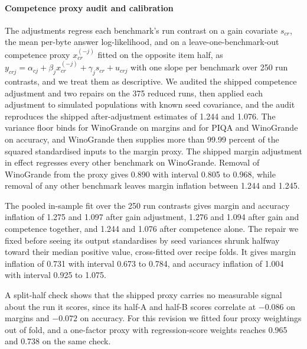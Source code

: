 \paragraph{Competence proxy audit and calibration}
\label{app:proxy}
The adjustments regress each benchmark's run contrast on a gain covariate $s_{cr}$, the mean per-byte answer log-likelihood, and on a leave-one-benchmark-out competence proxy $x_{cr}^{(-j)}$ fitted on the opposite item half, as $y_{crj}=\alpha_{cj}+\beta_jx_{cr}^{(-j)}+\gamma_js_{cr}+u_{crj}$ with one slope per benchmark over 250 run contrasts, and we treat them as descriptive. We audited the shipped competence adjustment and two repairs on the 375 reduced runs, then applied each adjustment to simulated populations with known seed covariance, and the audit reproduces the shipped after-adjustment estimates of 1.244 and 1.076. The variance floor binds for WinoGrande on margins and for PIQA and WinoGrande on accuracy, and WinoGrande then supplies more than 99.99 percent of the squared standardised inputs to the margin proxy. The shipped margin adjustment in effect regresses every other benchmark on WinoGrande. Removal of WinoGrande from the proxy gives 0.890 with interval 0.805 to 0.968, while removal of any other benchmark leaves margin inflation between 1.244 and 1.245.

The pooled in-sample fit over the 250 run contrasts gives margin and accuracy inflation of 1.275 and 1.097 after gain adjustment, 1.276 and 1.094 after gain and competence together, and 1.244 and 1.076 after competence alone. The repair we fixed before seeing its output standardises by seed variances shrunk halfway toward their median positive value, cross-fitted over recipe folds. It gives margin inflation of 0.731 with interval 0.673 to 0.784, and accuracy inflation of 1.004 with interval 0.925 to 1.075.

A split-half check shows that the shipped proxy carries no measurable signal about the run it scores, since its half-A and half-B scores correlate at $-0.086$ on margins and $-0.072$ on accuracy. For this revision we fitted four proxy weightings out of fold, and a one-factor proxy with regression-score weights reaches 0.965 and 0.738 on the same check.

